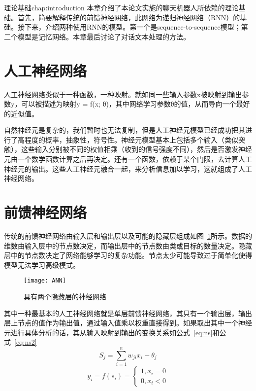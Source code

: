 \begin{cuzchapter}{理论基础}{chap:introduction}
本章介绍了本论文实施的聊天机器人所依赖的理论基础。首先，简要解释传统的前馈神经网络，此网络为递归神经网络（RNN）的基础。接下来，介绍两种使用RNN的模型。第一个是sequence-to-sequence模型；第二个模型是记忆网络。本章最后讨论了对话文本处理的方法。
\section{人工神经网络}\label{sec:background}
人工神经网络类似于一种函数，一种映射。就如同一些输入参数x被映射到输出参数y，可以被描述为映射y = f(x; θ)，其中网络学习参数θ的值，从而导向一个最好的近似值。

自然神经元是复杂的，我们暂时也无法复制，但是人工神经元模型已经成功把其进行了高程度的概率，抽象性，符号性。神经元模型基本上包括多个输入（类似突触），这些输入分别被不同的权值相乘（收到的信号强度不同），然后是否激发神经元由一个数学函数计算之后再决定。还有一个函数，依赖于某个门限，去计算人工神经元的输出。这些人工神经元融合一起，来分析信息加以学习，这就组成了人工神经网络。
\section{前馈神经网络}\label{sec:background}
传统的前馈神经网络由输入层和输出层以及可能的隐藏层组成如图~\ref{ANN}所示。数据的维数由输入层中的节点数决定，而输出层中的节点数由类或目标的数量决定。隐藏层中的节点数决定了网络能够学习的复杂功能。节点太少可能导致过于简单化使得模型无法学习高级模式。

\begin{figure}[!htbp]
    \centering
    \texttt{[image: ANN]}
    \caption[ANN]{具有两个隐藏层的神经网络}
    \label{ANN}
\end{figure}
\newpage
其中一种最基本的人工神经网络就是单层前馈神经网络，其只有一个输出层，输出层上节点的值作为输出值，通过输入值乘以权重直接得到。如果取出其中一个神经元进行具体分析的话，其从输入映射到输出的变换关系如公式~\ref{eq:ns}和公式~\ref{eq:ns2}
\begin{equation}
    \label{eq:ns}
        S_{j}=\sum ^{n}_{i=1}w_{ji}x_{i}-\theta _{j}
\end{equation}
\begin{equation}
    \label{eq:ns2}
    y_{i}=f\left( s_{i}\right) =\begin{cases}1,x_{i}=0\\
    0,x_{i} <0\end{cases}
\end{equation}


\end{cuzchapter}

